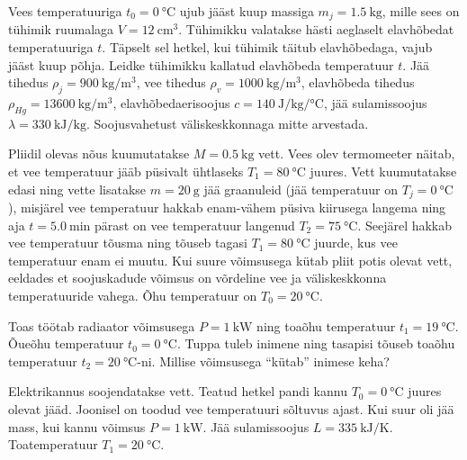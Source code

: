 \documentclass[a4paper,11pt,twocolumn]{article}
\begin{document}
\begin{question}[Lõppv 2018, P10]
	Vees temperatuuriga \( t_0=\SI{0}{\degreeCelsius} \) ujub jääst kuup massiga \( m_j=\SI{1,5}{\kilogram} \), mille sees on tühimik ruumalaga \( V = \SI{12}{\centi\meter\tothe{3}} \). Tühimikku valatakse hästi aeglaselt elavhõbedat temperatuuriga \( t \). Täpselt sel hetkel,	kui tühimik täitub elavhõbedaga, vajub jääst kuup põhja. Leidke tühimikku	kallatud elavhõbeda temperatuur \( t \). Jää tihedus \( \rho_j = \SI{900}{\kilogram\per\meter\cubed} \), vee	tihedus \( \rho_v = \SI{1000}{\kilogram\per\meter\cubed} \), elavhõbeda tihedus \( \rho_{Hg} = \SI{13600}{\kilogram\per\meter\cubed} \), elavhõbedaerisoojus \( c = \SI{140}{\joule\per\kilogram\per\degreeCelsius}\), jää sulamissoojus \( \lambda = \SI{330}{\kilo\joule\per\kilogram} \). Soojusvahetust väliskeskkonnaga mitte arvestada.
\end{question}
\begin{question}[Lõppv 2015, P7]
	Pliidil olevas nõus kuumutatakse \( M = \SI{0,5}{\kilogram} \) vett. Vees olev termomeeter näitab, et vee temperatuur jääb püsivalt ühtlaseks \( T_1 = \SI{80}{\degreeCelsius} \) juures. Vett kuumutatakse edasi ning vette lisatakse \( m = \SI{20}{\g} \) jää graanuleid (jää temperatuur on \( T_{j} = \SI{0}{\degreeCelsius} \)), misjärel vee temperatuur hakkab enam-vähem püsiva kiirusega langema ning aja \( t = \SI{5,0}{\minute} \) pärast on vee temperatuur langenud \( T_2 = \SI{75}{\degreeCelsius}\). Seejärel hakkab vee temperatuur tõusma ning tõuseb tagasi \( T_1 = \SI{80}{\degreeCelsius} \) juurde, kus vee temperatuur enam ei muutu. Kui suure võimsusega kütab pliit potis olevat vett, eeldades et soojuskadude võimsus on võrdeline vee ja väliskeskkonna temperatuuride vahega. Õhu temperatuur on \( T_0 = \SI{20}{\degreeCelsius} \).
\end{question}
\begin{question}
	Toas töötab radiaator võimsusega \( P=\SI{1}{\kilo\watt} \) ning toaõhu temperatuur \( t_1 = \SI{19}{\degreeCelsius} \). Õueõhu temperatuur \( t_0 = \SI{0}{\degreeCelsius} \). Tuppa tuleb inimene ning tasapisi tõuseb toaõhu temperatuur \( t_2 = \SI{20}{\degreeCelsius} \)-ni. Millise võimsusega “kütab” inimese keha?
\end{question}
\begin{question}[Lõppv 2004, G7][mat1][\columnwidth]
	Elektrikannus soojendatakse vett. Teatud hetkel pandi kannu \( T_0 = \SI{0}{\degreeCelsius}\) juures olevat jääd. Joonisel on toodud vee temperatuuri sõltuvus ajast. Kui suur oli jää mass, kui kannu võimsus \( P = \SI{1}{\kilo\watt}\). Jää sulamissoojus \( L = \SI{335}{\kilo\joule\per\kelvin}\). Toatemperatuur \( T_1 = \SI{20}{\degreeCelsius}\).
\end{question}
\end{document}
